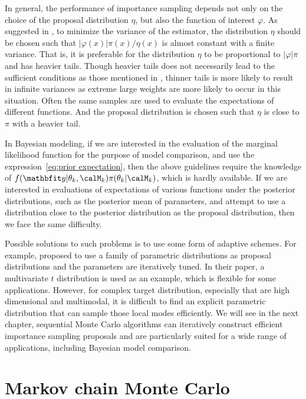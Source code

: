 In general, the performance of importance sampling depends not only on the
choice of the proposal distribution $\eta$, but also the function of interest
$\varphi$. As suggested in \cite[][sec.~3.3.2]{Robert:2004tn}, to minimize the
variance of the estimator, the distribution $\eta$ should be chosen such that
$|\varphi(x)|\pi(x)/\eta(x)$ is almost constant with a finite variance. That
is, it is preferable for the distribution $\eta$ to be proportional to
$|\varphi|\pi$ and has heavier tails. Though heavier tails does not
necessarily lead to the sufficient conditions as those mentioned in
\cite{Geweke:1989tm}, thinner tails is more likely to result in infinite
variances as extreme large weights are more likely to occur in this situation.
Often the same samples are used to evaluate the expectations of different
functions. And the proposal distribution is chosen such that $\eta$ is close
to $\pi$ with a heavier tail.

In Bayesian modeling, if we are interested in the evaluation of the marginal
likelihood function for the purpose of model comparison, and use the
expression~\ref{eq:prior expectation}, then the above guidelines require the
knowledge of $f(\data|\theta_k,\calM_k)\pi(\theta_k|\calM_k)$, which is hardly
available. If we are interested in evaluations of expectations of various
functions under the posterior distributions, such as the posterior mean of
parameters, and attempt to use a distribution close to the posterior
distribution as the proposal distribution, then we face the same difficulty.

Possible solutions to such problems is to use some form of adaptive schemes.
For example, \cite{ManSuk:1992vx} proposed to use a family of parametric
distributions as proposal distributions and the parameters are iteratively
tuned. In their paper, a multivariate $t$ distribution is used as an example,
which is flexible for some applications. However, for complex target
distribution, especially that are high dimensional and multimodal, it is
difficult to find an explicit parametric distribution that can sample those
local modes efficiently. We will see in the next chapter, sequential Monte
Carlo algorithms can iteratively construct efficient importance sampling
proposals and are particularly suited for a wide range of applications,
including Bayesian model comparison.

\section{Markov chain Monte Carlo}
\label{sec:Markov chain Monte Carlo}

